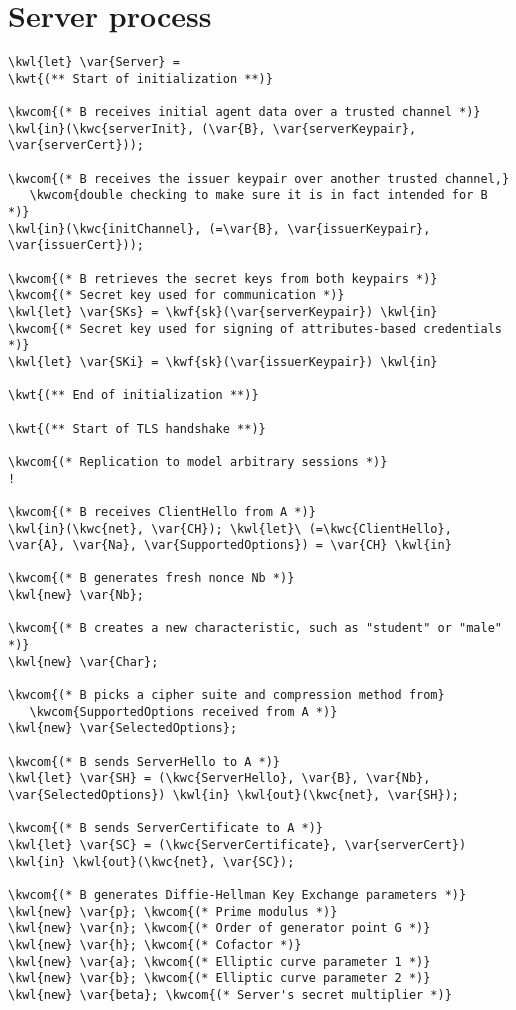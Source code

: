 \section{Server process}
\begin{Verbatim}[commandchars=\\\{\},codes={\catcode`$=3}]
\kwl{let} \var{Server} = 
\kwt{(** Start of initialization **)}

\kwcom{(* B receives initial agent data over a trusted channel *)}
\kwl{in}(\kwc{serverInit}, (\var{B}, \var{serverKeypair}, \var{serverCert}));

\kwcom{(* B receives the issuer keypair over another trusted channel,}
   \kwcom{double checking to make sure it is in fact intended for B *)}
\kwl{in}(\kwc{initChannel}, (=\var{B}, \var{issuerKeypair}, \var{issuerCert}));

\kwcom{(* B retrieves the secret keys from both keypairs *)}
\kwcom{(* Secret key used for communication *)}
\kwl{let} \var{SKs} = \kwf{sk}(\var{serverKeypair}) \kwl{in}
\kwcom{(* Secret key used for signing of attributes-based credentials *)}
\kwl{let} \var{SKi} = \kwf{sk}(\var{issuerKeypair}) \kwl{in}

\kwt{(** End of initialization **)}

\kwt{(** Start of TLS handshake **)}

\kwcom{(* Replication to model arbitrary sessions *)}
!

\kwcom{(* B receives ClientHello from A *)}
\kwl{in}(\kwc{net}, \var{CH}); \kwl{let}\ (=\kwc{ClientHello}, \var{A}, \var{Na}, \var{SupportedOptions}) = \var{CH} \kwl{in}

\kwcom{(* B generates fresh nonce Nb *)}
\kwl{new} \var{Nb}; 

\kwcom{(* B creates a new characteristic, such as "student" or "male" *)}
\kwl{new} \var{Char};

\kwcom{(* B picks a cipher suite and compression method from}
   \kwcom{SupportedOptions received from A *)}
\kwl{new} \var{SelectedOptions};

\kwcom{(* B sends ServerHello to A *)}
\kwl{let} \var{SH} = (\kwc{ServerHello}, \var{B}, \var{Nb}, \var{SelectedOptions}) \kwl{in} \kwl{out}(\kwc{net}, \var{SH});

\kwcom{(* B sends ServerCertificate to A *)}
\kwl{let} \var{SC} = (\kwc{ServerCertificate}, \var{serverCert}) \kwl{in} \kwl{out}(\kwc{net}, \var{SC});

\kwcom{(* B generates Diffie-Hellman Key Exchange parameters *)}
\kwl{new} \var{p}; \kwcom{(* Prime modulus *)}
\kwl{new} \var{n}; \kwcom{(* Order of generator point G *)}
\kwl{new} \var{h}; \kwcom{(* Cofactor *)}
\kwl{new} \var{a}; \kwcom{(* Elliptic curve parameter 1 *)}
\kwl{new} \var{b}; \kwcom{(* Elliptic curve parameter 2 *)}
\kwl{new} \var{beta}; \kwcom{(* Server's secret multiplier *)}


\end{Verbatim}
